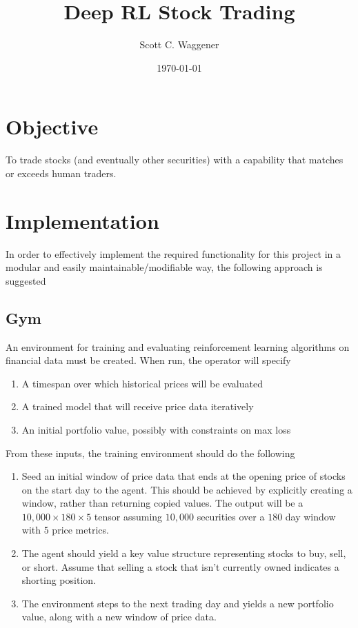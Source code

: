 \documentclass{article}
\title{Deep RL Stock Trading} %
\author{Scott C. Waggener} %
\date{\today} %
\begin{document}
\maketitle %

\section{Objective}


To trade stocks (and eventually other securities) with a capability
that matches or exceeds human traders.

\section{Implementation}

In order to effectively implement the required functionality for this
project in a modular and easily maintainable/modifiable way, the
following approach is suggested

\subsection{Gym}

	An environment for training and evaluating reinforcement learning
	algorithms on financial data must be created. When run, the operator
	will specify

	\begin{enumerate}
		\item A timespan over which historical prices will be evaluated
		\item A trained model that will receive price data iteratively
		\item An initial portfolio value, possibly with constraints on max
			loss
	\end{enumerate}

	From these inputs, the training environment should do the following

	\begin{enumerate}
		\item Seed an initial window of price data that ends at the
			opening price of stocks on the start day to the agent. This
			should be achieved by explicitly creating a window, rather than
			returning copied values. The output will be a
			$10,000 \times 180 \times 5$ tensor assuming $10,000$ securities
			over a $180$ day window with $5$ price metrics.
		\item The agent should yield a key value structure representing
			stocks to buy, sell, or short. Assume that selling a stock that
			isn't currently owned indicates a shorting position.
		\item The environment steps to the next trading day and yields a
			new portfolio value, along with a new window of price data.
	\end{enumerate}
\end{document}
